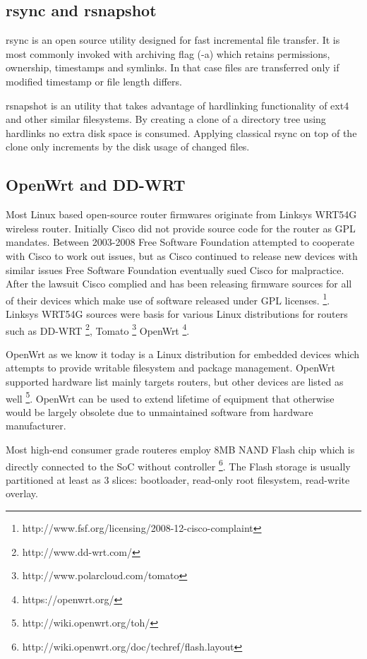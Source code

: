 \documentclass{article}
\begin{document}
\subsection{rsync and rsnapshot}

rsync is an open source utility designed for
fast incremental file transfer.
It is most commonly invoked with archiving flag (-a) which
retains permissions, ownership, timestamps and symlinks.
In that case files are transferred only if
modified timestamp or file length differs.

rsnapshot is an utility that takes advantage of hardlinking
functionality of ext4 and other similar filesystems.
By creating a clone of a directory tree using hardlinks no
extra disk space is consumed. Applying classical rsync on top of
the clone only increments by the disk usage of changed files.


\subsection{OpenWrt and DD-WRT}

Most Linux based open-source router firmwares originate from
Linksys WRT54G wireless router.
Initially Cisco did not provide source code for the router as GPL mandates.
Between 2003-2008 Free Software Foundation attempted to cooperate
with Cisco to work out issues, but as Cisco continued to release
new devices with similar issues Free Software Foundation eventually
sued Cisco for malpractice.
After the lawsuit Cisco complied and has been releasing firmware
sources for all of their devices which make use of software
released under GPL licenses.
\footnote{http://www.fsf.org/licensing/2008-12-cisco-complaint}.
Linksys WRT54G sources were basis for various Linux distributions for routers such as
DD-WRT \footnote{http://www.dd-wrt.com/},
Tomato \footnote{http://www.polarcloud.com/tomato}
OpenWrt \footnote{https://openwrt.org/}.

OpenWrt as we know it today is a Linux distribution for embedded devices
which attempts to provide writable filesystem and package management.
OpenWrt supported hardware list mainly targets routers, but other devices are
listed as well \footnote{http://wiki.openwrt.org/toh/}. OpenWrt can be used to
extend lifetime of equipment that otherwise would be largely obsolete due
to unmaintained software from hardware manufacturer.

Most high-end consumer grade routeres employ 8MB NAND Flash chip which is
directly connected to the SoC without controller
\footnote{http://wiki.openwrt.org/doc/techref/flash.layout}.
The Flash storage is usually partitioned at least as 3 slices:
bootloader, read-only root filesystem, read-write overlay.
\end{document}
